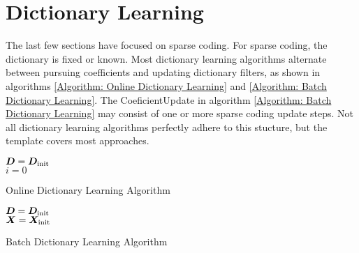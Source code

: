 \section{Dictionary Learning}
The last few sections have focused on sparse coding. For sparse coding, the dictionary is fixed or known. Most dictionary learning algorithms alternate between pursuing coefficients and updating dictionary filters, as shown in algorithms \ref{Algorithm: Online Dictionary Learning} and \ref{Algorithm: Batch Dictionary Learning}. The CoeficientUpdate in algorithm \ref{Algorithm: Batch Dictionary Learning} may consist of one or more sparse coding update steps. Not all dictionary learning algorithms perfectly adhere to this stucture, but the template covers most approaches.
\begin{algorithm}[h] \label{Algorithm: Online Dictionary Learning}
\SetAlgoLined
   $\bm{D} = \bm{D}_{\text{init}}$ \\
   $i = 0$
 \caption{Online Dictionary Learning Algorithm}
\end{algorithm}
\begin{algorithm}[h] \label{Algorithm: Batch Dictionary Learning}
\SetAlgoLined
   $\bm{D} = \bm{D}_{\text{init}}$ \\
   $\bm{X} = \bm{X}_{\text{init}}$ \\
 \caption{Batch Dictionary Learning Algorithm}
\end{algorithm}

